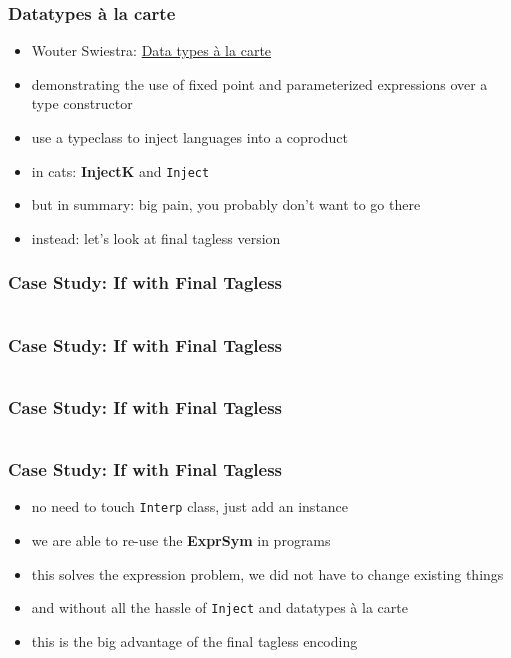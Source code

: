 \documentclass[aspectratio=169, hyperref={colorlinks, linkcolor=beamer@centricgreen}, urlcolor=links]{beamer}
\begin{document}
\begin{frame}
  \frametitle{Datatypes \`{a} la carte}
  \begin{itemize}
  \item Wouter Swiestra: \href{https://www.cs.ru.nl/~W.Swierstra/Publications/DataTypesALaCarte.pdf}{Data types \`{a} la carte}
  \item demonstrating the use of fixed point and parameterized expressions over a type constructor
  \item use a typeclass to inject languages into a coproduct
  \item in cats: \textbf{InjectK} and \texttt{Inject}
  \item but in summary: big pain, you probably don't want to go there
  \item instead: let's look at final tagless version
  \end{itemize}
\end{frame}

\begin{frame}[fragile]
  \frametitle{Case Study: If with Final Tagless}
  \inputminted[fontsize=\footnotesize]{scala}{snippets/final-tagless-expr-if.scala}
\end{frame}

\begin{frame}[fragile]
  \frametitle{Case Study: If with Final Tagless}
  \inputminted[fontsize=\footnotesize]{scala}{snippets/final-tagless-sample-if.scala}
\end{frame}

\begin{frame}[fragile]
  \frametitle{Case Study: If with Final Tagless}
  \inputminted[fontsize=\footnotesize]{scala}{snippets/final-tagless-interp-if.scala}
\end{frame}

\begin{frame}
  \frametitle{Case Study: If with Final Tagless}
  \begin{itemize}
  \item no need to touch \texttt{Interp} class, just add an instance
  \item we are able to re-use the \textbf{ExprSym} in programs
  \item this solves the expression problem, we did not have to change existing things
  \item and without all the hassle of \texttt{Inject} and datatypes \`{a} la carte
  \item this is the big advantage of the final tagless encoding
  \end{itemize}
\end{frame}
\end{document}
